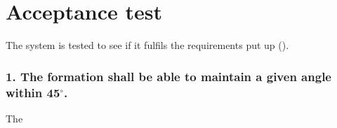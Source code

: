 \chapter{Acceptance test} \label{chap:acceptanceTest}
The system is tested to see if it fulfils the requirements put up ().

\subsection{1. The formation shall be able to maintain a given angle within 45$^{\circ}$.}
The
